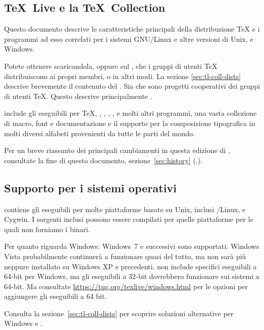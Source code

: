 \documentclass{article}
\begin{document}
\subsection{\protect\TeX\protect\ Live e la \protect\TeX\protect\ Collection}

Questo documento descrive le caratteristiche principali della
distribuzione \TL{}\Dash \TeX{} e i programmi ad esso correlati per
i sistemi GNU/Linux e altre versioni di Unix, \MacOSX{} e Windows.

Potete ottenere \TL{} scaricandola, oppure sul \DVD{} \TK, che i gruppi di
utenti \TeX{} distribuiscono ai propri membri, o in altri modi. La sezione
\ref{sec:tl-coll-dists} descrive brevemente il contenuto del \DVD. Sia
\TL{} che \TK{} sono progetti cooperativi dei gruppi di utenti \TeX.
Questo descrive principalmente \TL.

\TL{} include gli eseguibili per \TeX, \LaTeXe, \ConTeXt, \MF, \MP,
\BibTeX{} e molti altri programmi, una vasta collezione di macro, font e
documentazione e il supporto per la composizione tipografica in molti
diversi alfabeti provenienti da tutte le parti del mondo.

Per un breve riassunto dei principali cambiamenti in questa edizione di
\TL, consultate la fine di questo documento, sezione~\ref{sec:history}
(\p.\pageref{sec:history}).



\subsection{Supporto per i sistemi operativi}
\label{sec:os-support}

\TL{} contiene gli eseguibili per molte piattaforme basate su Unix,
inclusi \GNU/Linux, \MacOSX{} e Cygwin. I sorgenti inclusi possono essere
compilati per quelle piattaforme per le quali non forniamo i binari.

Per quanto riguarda Windows: Windows~7 e successivi sono supportati.
Windows Vista probabilmente continuerà a funzionare quasi del
tutto, ma \TL{} non sarà più neppure installato su Windows XP e
precedenti. \TL{} non include specifici eseguibili a 64-bit per Windows, ma
gli eseguibili a 32-bit dovrebbero funzionare sui sistemi a 64-bit.
Ma consultate \url{https://tug.org/texlive/windows.html} per le
opzioni per aggiungere gli eseguibili a 64 bit.

Consulta la sezione~\ref{sec:tl-coll-dists} per scoprire soluzioni
alternative per Windows e \MacOSX.
\end{document}
